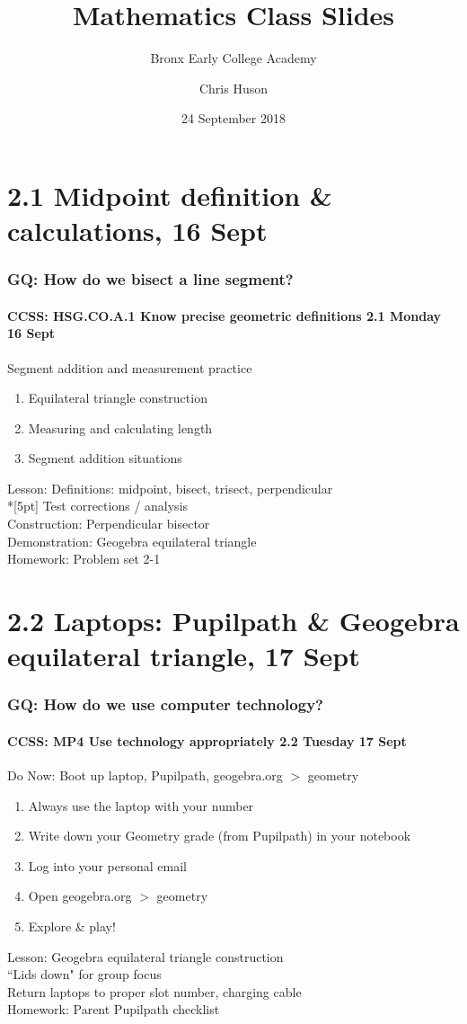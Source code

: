 \documentclass{beamer}
\title{Mathematics Class Slides}
\subtitle{Bronx Early College Academy}
\author{Chris Huson}
\date{24 September 2018}
\begin{document}
\frame{\titlepage}
\section[Outline]{}
\frame{\tableofcontents}

\section{2.1 Midpoint definition \& calculations, 16 Sept}
  \frame
  {
    \frametitle{GQ: How do we bisect a line segment?}
    \framesubtitle{CCSS: HSG.CO.A.1 Know precise geometric definitions \hfill \alert{2.1 Monday 16 Sept}}

    \begin{block}{Segment addition and measurement practice}
    \begin{enumerate}
      \item Equilateral triangle construction
      \item Measuring and calculating length
      \item Segment addition situations
    \end{enumerate}
    \end{block}
    Lesson: Definitions: midpoint, bisect, trisect, perpendicular \\*[5pt]
    Test corrections / analysis\\
    Construction: Perpendicular bisector\\
    Demonstration: Geogebra equilateral triangle\\ \smallskip
    Homework: Problem set 2-1 
  }

  \section{2.2 Laptops: Pupilpath \& Geogebra equilateral triangle, 17 Sept}
  \frame
  {
    \frametitle{GQ: How do we use computer technology?}
    \framesubtitle{CCSS: MP4 Use technology appropriately \hfill \alert{2.2 Tuesday 17 Sept}}
  
    \begin{block}{Do Now: Boot up laptop, Pupilpath, geogebra.org $>$ geometry}
    \begin{enumerate}
        \item Always use the laptop with your number
        \item Write down your Geometry grade (from Pupilpath) in your notebook
        \item Log into your personal email
        \item Open geogebra.org $>$ geometry
        \item Explore \& play!\\
    \end{enumerate}
    \end{block}
    Lesson: Geogebra equilateral triangle construction\\
    ``Lids down" for group focus \\
    Return laptops to proper slot number, charging cable \\ \vspace{0.25cm}
    Homework: Parent Pupilpath checklist
  }
\end{document}
